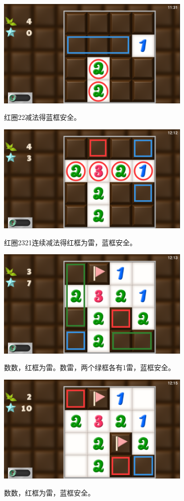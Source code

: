 \subsection{} %
\begin{center}
    \includegraphics[width=0.7\textwidth]{puzzle/22-1.png}
\end{center}
红圈22减法得蓝框安全。
\begin{center}
    \includegraphics[width=0.7\textwidth]{puzzle/22-2.png}
\end{center}
红圈2321连续减法得红框为雷，蓝框安全。
\begin{center}
    \includegraphics[width=0.7\textwidth]{puzzle/22-3.png}
\end{center}
数数，红框为雷。数雷，两个绿框各有1雷，蓝框安全。
\begin{center}
    \includegraphics[width=0.7\textwidth]{puzzle/22-4.png}
\end{center}
数数，红框为雷，蓝框安全。

